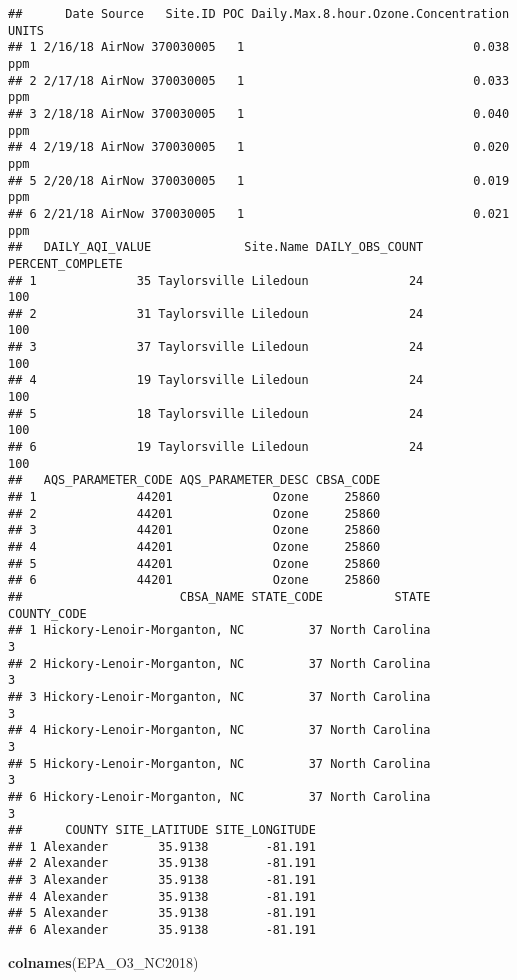 \documentclass[]{article}
\newenvironment{Shaded}{\begin{snugshade}}{\end{snugshade}}
\newcommand{\KeywordTok}[1]{\textcolor[rgb]{0.13,0.29,0.53}{\textbf{#1}}}
\newcommand{\NormalTok}[1]{#1}
\begin{document}
\begin{verbatim}
##      Date Source   Site.ID POC Daily.Max.8.hour.Ozone.Concentration UNITS
## 1 2/16/18 AirNow 370030005   1                                0.038   ppm
## 2 2/17/18 AirNow 370030005   1                                0.033   ppm
## 3 2/18/18 AirNow 370030005   1                                0.040   ppm
## 4 2/19/18 AirNow 370030005   1                                0.020   ppm
## 5 2/20/18 AirNow 370030005   1                                0.019   ppm
## 6 2/21/18 AirNow 370030005   1                                0.021   ppm
##   DAILY_AQI_VALUE             Site.Name DAILY_OBS_COUNT PERCENT_COMPLETE
## 1              35 Taylorsville Liledoun              24              100
## 2              31 Taylorsville Liledoun              24              100
## 3              37 Taylorsville Liledoun              24              100
## 4              19 Taylorsville Liledoun              24              100
## 5              18 Taylorsville Liledoun              24              100
## 6              19 Taylorsville Liledoun              24              100
##   AQS_PARAMETER_CODE AQS_PARAMETER_DESC CBSA_CODE
## 1              44201              Ozone     25860
## 2              44201              Ozone     25860
## 3              44201              Ozone     25860
## 4              44201              Ozone     25860
## 5              44201              Ozone     25860
## 6              44201              Ozone     25860
##                      CBSA_NAME STATE_CODE          STATE COUNTY_CODE
## 1 Hickory-Lenoir-Morganton, NC         37 North Carolina           3
## 2 Hickory-Lenoir-Morganton, NC         37 North Carolina           3
## 3 Hickory-Lenoir-Morganton, NC         37 North Carolina           3
## 4 Hickory-Lenoir-Morganton, NC         37 North Carolina           3
## 5 Hickory-Lenoir-Morganton, NC         37 North Carolina           3
## 6 Hickory-Lenoir-Morganton, NC         37 North Carolina           3
##      COUNTY SITE_LATITUDE SITE_LONGITUDE
## 1 Alexander       35.9138        -81.191
## 2 Alexander       35.9138        -81.191
## 3 Alexander       35.9138        -81.191
## 4 Alexander       35.9138        -81.191
## 5 Alexander       35.9138        -81.191
## 6 Alexander       35.9138        -81.191
\end{verbatim}

\begin{Shaded}
\begin{Highlighting}[]
\KeywordTok{colnames}\NormalTok{(EPA_O3_NC2018)}
\end{Highlighting}
\end{Shaded}
\end{document}
